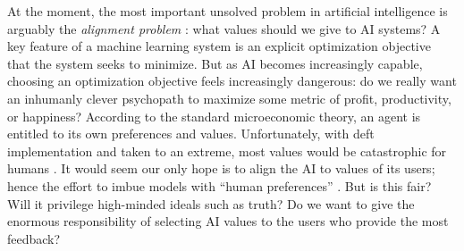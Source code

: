 At the moment, the most important unsolved problem in
    artificial intelligence is arguably the \emph{alignment problem}
\citep{wiener-alignment1960,alignment-zhuang-2020-NeurIPS,christian2020alignment}:
what values should we give to AI systems? 
A key feature of a machine learning system is an explicit optimization objective that the system seeks to minimize. 
But as AI becomes increasingly capable, choosing an optimization objective 
    feels increasingly dangerous:
do we really want
an inhumanly clever psychopath to maximize some metric of profit, productivity, or happiness? 
According to the standard microeconomic theory, an agent is entitled to its own preferences and values.
Unfortunately, with deft implementation and taken to an extreme, most values would be catastrophic for humans \citep{bostrom-superintelligence}. 
It would seem our only hope is to align the AI to values of its users;
    hence the effort to imbue models with 
    ``human preferences'' \citep{christiano2017deep}.
%
But is this fair?
Will it privilege high-minded ideals such as truth?
Do we want to give the enormous responsibility of selecting AI values to the users who provide the most feedback?
%

